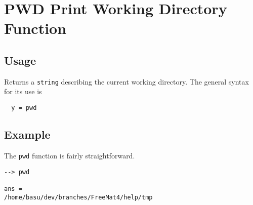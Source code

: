 \section{PWD Print Working Directory Function}

\subsection{Usage}

Returns a \verb|string| describing the current working directory.  The general syntax for its use is
\begin{verbatim}
  y = pwd
\end{verbatim}

\subsection{Example}

The \verb|pwd| function is fairly straightforward.
\begin{verbatim}
--> pwd

ans = 
/home/basu/dev/branches/FreeMat4/help/tmp
\end{verbatim}

